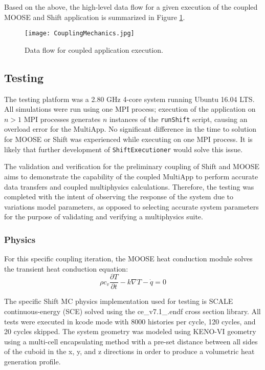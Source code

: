 \documentclass{anstrans}
\begin{document}
Based on the above, the high-level data flow for a given execution of the coupled MOOSE and Shift application is summarized in Figure \ref{fig:DataFlow}.

\begin{figure}[t] 
	\centering
	\texttt{[image: CouplingMechanics.jpg]}
	\caption{Data flow for coupled application execution.}
	\label{fig:DataFlow}
\end{figure}

\vspace*{-1em}\subsection{Testing}
The testing platform was a 2.80 GHz 4-core system running Ubuntu 16.04 LTS. All simulations were run using one MPI process; execution of the application on $n > 1$ MPI processes generates $n$ instances of the \texttt{runShift} script, causing an overload error for the MultiApp. No significant difference in the time to solution for MOOSE or Shift was experienced while executing on one MPI process. It is likely that further development of \texttt{ShiftExecutioner} would solve this issue.

The validation and verification for the preliminary coupling of Shift and MOOSE aims to demonstrate the capability of the coupled MultiApp to perform accurate data transfers and coupled multiphysics calculations. Therefore, the testing was completed with the intent of observing the response of the system due to variations model parameters, as opposed to selecting accurate system parameters for the purpose of validating and verifying a multiphysics suite.

\subsubsection{Physics}
For this specific coupling iteration, the MOOSE heat conduction module solves the transient heat conduction equation:
\begin{equation}
\rho c_v \frac{\partial T}{\partial t} - k\nabla T - \dot{q} = 0
\label{eqn:conduction}
\end{equation} 
	
The specific Shift MC physics implementation used for testing is SCALE continuous-energy (SCE) solved using the ce\_v7.1\_.endf cross section library. All tests were executed in kcode mode with 8000 histories per cycle, 120 cycles, and 20 cycles skipped. The system geometry was modeled using KENO-VI geometry using a multi-cell encapsulating method with a pre-set distance between all sides of the cuboid in the x, y, and z directions in order to produce a volumetric heat generation profile. 
\end{document}
